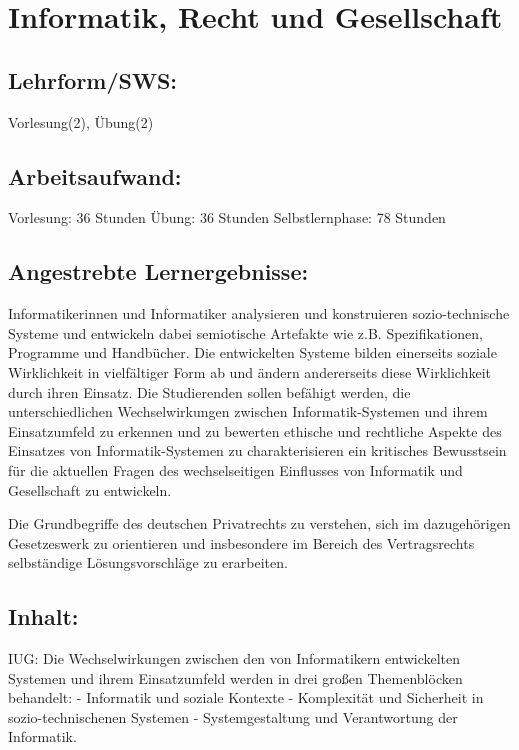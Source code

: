 \chapter{Informatik, Recht und
Gesellschaft}\label{informatik-recht-und-gesellschaft}

\section{Lehrform/SWS:}\label{lehrformsws-15}

Vorlesung(2), Übung(2)

\section{Arbeitsaufwand:}\label{arbeitsaufwand-15}

Vorlesung: 36 Stunden Übung: 36 Stunden Selbstlernphase: 78 Stunden

\section{Angestrebte
Lernergebnisse:}\label{angestrebte-lernergebnisse-16}

Informatikerinnen und Informatiker analysieren und konstruieren
sozio-technische Systeme und entwickeln dabei semiotische Artefakte wie
z.B. Spezifikationen, Programme und Handbücher. Die entwickelten Systeme
bilden einerseits soziale Wirklichkeit in vielfältiger Form ab und
ändern andererseits diese Wirklichkeit durch ihren Einsatz. Die
Studierenden sollen befähigt werden, die unterschiedlichen
Wechselwirkungen zwischen Informatik-Systemen und ihrem Einsatzumfeld zu
erkennen und zu bewerten ethische und rechtliche Aspekte des Einsatzes
von Informatik-Systemen zu charakterisieren ein kritisches Bewusstsein
für die aktuellen Fragen des wechselseitigen Einflusses von Informatik
und Gesellschaft zu entwickeln.

Die Grundbegriffe des deutschen Privatrechts zu verstehen, sich im
dazugehörigen Gesetzeswerk zu orientieren und insbesondere im Bereich
des Vertragsrechts selbständige Lösungsvorschläge zu erarbeiten.

\section{Inhalt:}\label{inhalt-16}

IUG: Die Wechselwirkungen zwischen den von Informatikern entwickelten
Systemen und ihrem Einsatzumfeld werden in drei großen Themenblöcken
behandelt: - Informatik und soziale Kontexte - Komplexität und
Sicherheit in sozio-technischenen Systemen - Systemgestaltung und
Verantwortung der Informatik.

